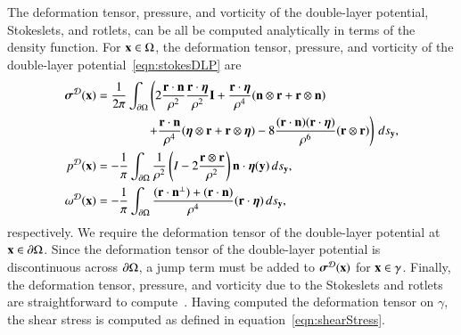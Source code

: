 \documentclass[preprint, 10pt]{elsarticle}
\begin{document}
The deformation tensor, pressure, and vorticity of the double-layer
potential, Stokeslets, and rotlets, can be all be computed analytically
in terms of the density function.  For ${\mathbf{x}} \in \Omega$, the deformation
tensor, pressure, and vorticity of the double-layer
potential~\eqref{eqn:stokesDLP} are
\begin{align}
  \label{eqn:deformationDLP} 
  {\boldsymbol\sigma}^{\mathcal{D}}({\mathbf{x}}) &= \frac{1}{2\pi}\int_{{\partial}\Omega} \left(
    2\frac{{\mathbf{r}} \cdot {\mathbf{n}}}{\rho^2} \frac{{\mathbf{r}} \cdot {\boldsymbol\eta}}{\rho^2} {\mathbf{I}} + 
    \frac{{\mathbf{r}} \cdot {\boldsymbol\eta}}{\rho^4} ({\mathbf{n}} \otimes {\mathbf{r}} + {\mathbf{r}} \otimes {\mathbf{n}}) 
    \right. \nonumber \\
    & \qquad\qquad \left.
    +\frac{{\mathbf{r}} \cdot {\mathbf{n}}}{\rho^4} ({\boldsymbol\eta} \otimes {\mathbf{r}} + {\mathbf{r}} \otimes {\boldsymbol\eta}) - 
    8\frac{({\mathbf{r}} \cdot {\mathbf{n}})({\mathbf{r}} \cdot {\boldsymbol\eta})}{\rho^6}({\mathbf{r}} \otimes {\mathbf{r}})
    \right) \, ds_{\mathbf{y}}, \\
  p^{\mathcal{D}}({\mathbf{x}}) &= -\frac{1}{\pi}\int_{{\partial}\Omega} \frac{1}{\rho^2}
    \left(I - 2 \frac{{\mathbf{r}} \otimes {\mathbf{r}}}{\rho^2}\right) {\mathbf{n}} \cdot
      {\boldsymbol\eta}({\mathbf{y}})\,ds_{\mathbf{y}}, \\
  \omega^{\mathcal{D}}({\mathbf{x}}) &= -\frac{1}{\pi} \int_{{\partial}\Omega}
    \frac{({\mathbf{r}} \cdot {\mathbf{n}}^\perp) + ({\mathbf{r}} \cdot {\mathbf{n}})}{\rho^4} 
      ({\mathbf{r}} \cdot {\boldsymbol\eta}) \, ds_{\mathbf{y}},
\end{align}
respectively. We require the deformation tensor of the double-layer potential at
${\mathbf{x}} \in {\partial} \Omega$.  Since the deformation tensor of the double-layer
potential is discontinuous across ${\partial}\Omega$, a jump term must be added
to ${\boldsymbol\sigma}^{\mathcal{D}}({\mathbf{x}})$ for ${\mathbf{x}} \in \gamma$.  Finally, the deformation
tensor, pressure, and vorticity due to the Stokeslets and rotlets are
straightforward to compute~\cite{qua-moo2018}.  Having computed the
deformation tensor on $\gamma$, the shear stress is computed as defined
in equation~\eqref{eqn:shearStress}.  

\end{document}
